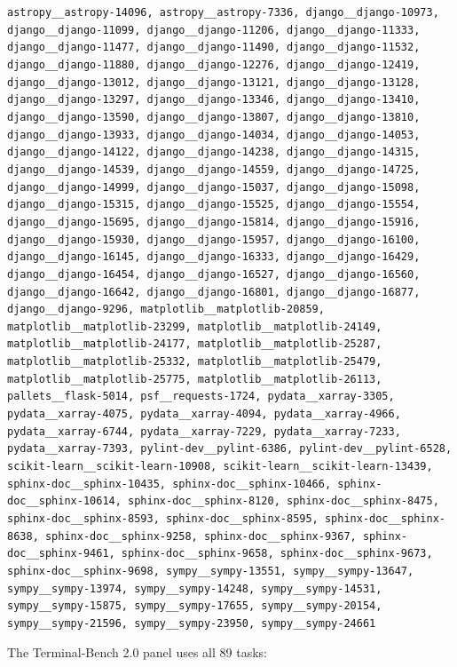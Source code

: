 {\scriptsize\texttt{astropy\_\_astropy-14096, astropy\_\_astropy-7336, django\_\_django-10973, django\_\_django-11099, django\_\_django-11206, django\_\_django-11333, django\_\_django-11477, django\_\_django-11490, django\_\_django-11532, django\_\_django-11880, django\_\_django-12276, django\_\_django-12419, django\_\_django-13012, django\_\_django-13121, django\_\_django-13128, django\_\_django-13297, django\_\_django-13346, django\_\_django-13410, django\_\_django-13590, django\_\_django-13807, django\_\_django-13810, django\_\_django-13933, django\_\_django-14034, django\_\_django-14053, django\_\_django-14122, django\_\_django-14238, django\_\_django-14315, django\_\_django-14539, django\_\_django-14559, django\_\_django-14725, django\_\_django-14999, django\_\_django-15037, django\_\_django-15098, django\_\_django-15315, django\_\_django-15525, django\_\_django-15554, django\_\_django-15695, django\_\_django-15814, django\_\_django-15916, django\_\_django-15930, django\_\_django-15957, django\_\_django-16100, django\_\_django-16145, django\_\_django-16333, django\_\_django-16429, django\_\_django-16454, django\_\_django-16527, django\_\_django-16560, django\_\_django-16642, django\_\_django-16801, django\_\_django-16877, django\_\_django-9296, matplotlib\_\_matplotlib-20859, matplotlib\_\_matplotlib-23299, matplotlib\_\_matplotlib-24149, matplotlib\_\_matplotlib-24177, matplotlib\_\_matplotlib-25287, matplotlib\_\_matplotlib-25332, matplotlib\_\_matplotlib-25479, matplotlib\_\_matplotlib-25775, matplotlib\_\_matplotlib-26113, pallets\_\_flask-5014, psf\_\_requests-1724, pydata\_\_xarray-3305, pydata\_\_xarray-4075, pydata\_\_xarray-4094, pydata\_\_xarray-4966, pydata\_\_xarray-6744, pydata\_\_xarray-7229, pydata\_\_xarray-7233, pydata\_\_xarray-7393, pylint-dev\_\_pylint-6386, pylint-dev\_\_pylint-6528, scikit-learn\_\_scikit-learn-10908, scikit-learn\_\_scikit-learn-13439, sphinx-doc\_\_sphinx-10435, sphinx-doc\_\_sphinx-10466, sphinx-doc\_\_sphinx-10614, sphinx-doc\_\_sphinx-8120, sphinx-doc\_\_sphinx-8475, sphinx-doc\_\_sphinx-8593, sphinx-doc\_\_sphinx-8595, sphinx-doc\_\_sphinx-8638, sphinx-doc\_\_sphinx-9258, sphinx-doc\_\_sphinx-9367, sphinx-doc\_\_sphinx-9461, sphinx-doc\_\_sphinx-9658, sphinx-doc\_\_sphinx-9673, sphinx-doc\_\_sphinx-9698, sympy\_\_sympy-13551, sympy\_\_sympy-13647, sympy\_\_sympy-13974, sympy\_\_sympy-14248, sympy\_\_sympy-14531, sympy\_\_sympy-15875, sympy\_\_sympy-17655, sympy\_\_sympy-20154, sympy\_\_sympy-21596, sympy\_\_sympy-23950, sympy\_\_sympy-24661}}

The Terminal-Bench 2.0 panel uses all 89 tasks:

